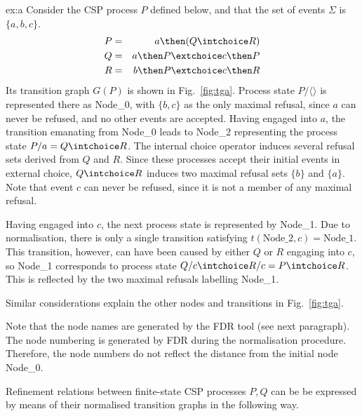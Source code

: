 \begin{example}{ex:a}
Consider the CSP process $P$ defined below, and that the set of events
$\Sigma$ is $\{a,b,c\}$.
\begin{eqnarray*}
P & = & a \then (Q\intchoice R)
\\
Q & = & a \then P \extchoice c \then P
\\
R & = & b \then P \extchoice c \then R
\end{eqnarray*}
Its transition graph $G(P)$ is shown in Fig.~\ref{fig:tga}. Process state
$P/\langle\rangle$ is represented there as Node\_0, with $\{ b,c\}$ as the
only maximal refusal, since $a$ can never be refused, and no other events are
accepted. Having engaged into $a$, the transition emanating from Node\_0
leads to Node\_2 representing  the process state $P/a = Q\intchoice R$. The
internal choice operator induces several refusal sets derived from $Q$ and
$R$. Since these processes accept their initial events in external choice,
$Q\intchoice R$ induces two maximal refusal sets $\{b\}$ and
$\{a\}$. Note that event $c$ can never be refused, since it is not a member
of any maximal refusal.

Having engaged into $c$, the next process state is represented by Node\_1.
Due to normalisation, there is only a single transition satisfying
$t(\text{Node\_2},c) = \text{Node\_1}$. This transition, however, can have
been caused by either $Q$ or $R$ engaging into $c$, so Node\_1 corresponds to
process state $Q/c \intchoice R/c = P \intchoice R$. This is reflected by the
two maximal refusals labelling Node\_1.

Similar considerations explain the other nodes and transitions in
Fig.~\ref{fig:tga}.

Note that the node names are generated by the FDR tool (see next paragraph).
The node numbering is generated by FDR during the normalisation procedure.
Therefore, the node numbers do not reflect the distance from the initial node
Node\_0.
\end{example}

Refinement relations between finite-state CSP processes $P, Q$ 
can be be expressed by means of their normalised transition graphs in the following way.

